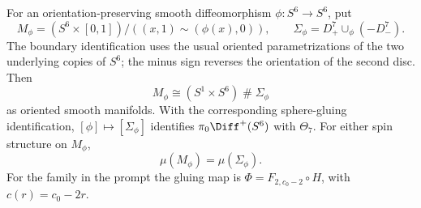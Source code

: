 \begin{proposition}\label{push:src:C.1.1}
For an orientation-preserving smooth diffeomorphism
$\phi:S^6\to S^6$, put
\[
 M_\phi=(S^6\times[0,1])/((x,1)\sim(\phi(x),0)),\qquad
 \Sigma_\phi=D^7_+\cup_\phi(-D^7_-).
\]
The boundary identification uses the usual oriented parametrizations
of the two underlying copies of $S^6$; the minus sign reverses the
orientation of the second disc. Then
\[
 M_\phi\cong (S^1\times S^6)\mathbin\#\Sigma_\phi
\]
as oriented smooth manifolds. With the corresponding sphere-gluing
identification, $[\phi]\mapsto[\Sigma_\phi]$ identifies
$\pi_0\Diff^+(S^6)$ with $\Theta_7$. For either spin structure on
$M_\phi$,
\[
 \mu(M_\phi)=\mu(\Sigma_\phi).
\]
For the family in the prompt the gluing map is
$\Phi=F_{2,c_0-2}\circ H$, with $c(r)=c_0-2r$.
\end{proposition}

